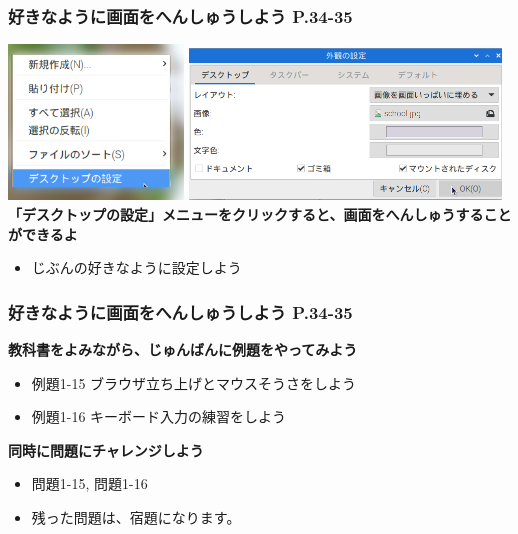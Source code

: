 \documentclass[dvipdfmx]{beamer}
\begin{document}
\begin{frame}[fragile]
	\frametitle{好きなように画面をへんしゅうしよう P.34-35~~~}
  \includegraphics[width=0.35\textwidth]{slide02_007.png}
  \hfill
  \includegraphics[width=0.62\textwidth]{slide02_008.png}
  \vfill
  \large\textbf{「デスクトップの設定」メニューをクリックすると、画面をへんしゅうすることができるよ}
  \begin{itemize}
    \item じぶんの好きなように設定しよう
  \end{itemize}

\end{frame}

\begin{frame}[fragile]
	\frametitle{好きなように画面をへんしゅうしよう P.34-35~~~}
    \large\textbf{教科書をよみながら、じゅんばんに例題をやってみよう}
    				\begin{itemize}
    					\item 例題1-15 ブラウザ立ち上げとマウスそうさをしよう
    					\item 例題1-16 キーボード入力の練習をしよう
    				\end{itemize}
          \vfill
          \large\textbf{同時に問題にチャレンジしよう}
          \begin{itemize}
            \item 問題1-15, 問題1-16
            \item 残った問題は、宿題になります。
          \end{itemize}
\end{frame}
\end{document}
